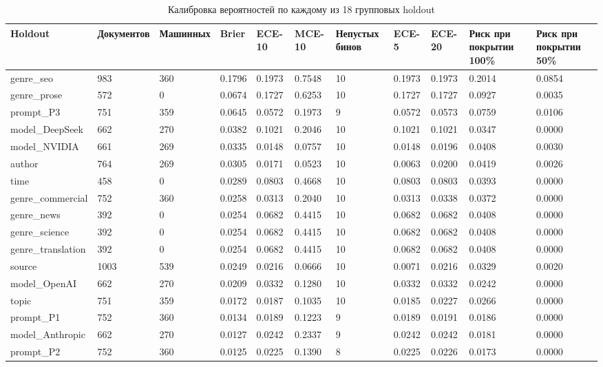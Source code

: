 \begin{table}[htbp]
\centering
\scriptsize
\caption{Калибровка вероятностей по каждому из 18 групповых holdout}
\label{tab:s6}
\begin{tabular}{lllllllllll}
\toprule
Holdout & Документов & Машинных & Brier & ECE-10 & MCE-10 & Непустых бинов & ECE-5 & ECE-20 & Риск при покрытии 100\% & Риск при покрытии 50\% \\
\midrule
genre\_seo & 983 & 360 & 0.1796 & 0.1973 & 0.7548 & 10 & 0.1973 & 0.1973 & 0.2014 & 0.0854 \\
genre\_prose & 572 & 0 & 0.0674 & 0.1727 & 0.6253 & 10 & 0.1727 & 0.1727 & 0.0927 & 0.0035 \\
prompt\_P3 & 751 & 359 & 0.0645 & 0.0572 & 0.1973 & 9 & 0.0572 & 0.0573 & 0.0759 & 0.0106 \\
model\_DeepSeek & 662 & 270 & 0.0382 & 0.1021 & 0.2046 & 10 & 0.1021 & 0.1021 & 0.0347 & 0.0000 \\
model\_NVIDIA & 661 & 269 & 0.0335 & 0.0148 & 0.0757 & 10 & 0.0148 & 0.0196 & 0.0408 & 0.0030 \\
author & 764 & 269 & 0.0305 & 0.0171 & 0.0523 & 10 & 0.0063 & 0.0200 & 0.0419 & 0.0026 \\
time & 458 & 0 & 0.0289 & 0.0803 & 0.4668 & 10 & 0.0803 & 0.0803 & 0.0393 & 0.0000 \\
genre\_commercial & 752 & 360 & 0.0258 & 0.0313 & 0.2040 & 10 & 0.0313 & 0.0338 & 0.0372 & 0.0000 \\
genre\_news & 392 & 0 & 0.0254 & 0.0682 & 0.4415 & 10 & 0.0682 & 0.0682 & 0.0408 & 0.0000 \\
genre\_science & 392 & 0 & 0.0254 & 0.0682 & 0.4415 & 10 & 0.0682 & 0.0682 & 0.0408 & 0.0000 \\
genre\_translation & 392 & 0 & 0.0254 & 0.0682 & 0.4415 & 10 & 0.0682 & 0.0682 & 0.0408 & 0.0000 \\
source & 1003 & 539 & 0.0249 & 0.0216 & 0.0666 & 10 & 0.0071 & 0.0216 & 0.0329 & 0.0020 \\
model\_OpenAI & 662 & 270 & 0.0209 & 0.0332 & 0.1280 & 10 & 0.0332 & 0.0332 & 0.0242 & 0.0000 \\
topic & 751 & 359 & 0.0172 & 0.0187 & 0.1035 & 10 & 0.0185 & 0.0227 & 0.0266 & 0.0000 \\
prompt\_P1 & 752 & 360 & 0.0134 & 0.0189 & 0.1223 & 9 & 0.0189 & 0.0191 & 0.0186 & 0.0000 \\
model\_Anthropic & 662 & 270 & 0.0127 & 0.0242 & 0.2337 & 9 & 0.0242 & 0.0242 & 0.0181 & 0.0000 \\
prompt\_P2 & 752 & 360 & 0.0125 & 0.0225 & 0.1390 & 8 & 0.0225 & 0.0226 & 0.0173 & 0.0000 \\

\end{tabular}
\end{table}
